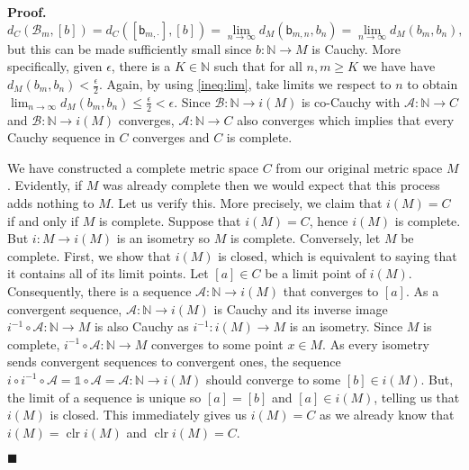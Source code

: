 \documentclass[10pt]{article}
\theoremstyle{definition}
\theoremstyle{remark}
\newenvironment{prf}{\noindent\textbf{Proof.}}{\hfill$\blacksquare$}
\DeclareMathOperator{\clr}{\text{clr}}
\begin{document}
\begin{prf}
\begin{equation}
d_C(\mathcal{B}_m,[b]) = d_C([\mathsf{b}_{m,\cdot}],[b]) = \lim_{n\to\infty}d_M(\mathsf{b}_{m,n},b_n) = \lim_{n\to\infty}d_M(b_m,b_n),
\end{equation}
but this can be made sufficiently small since $b:\mathbb{N}\to M$ is Cauchy. More specifically, given $\epsilon$, there is a $K\in\mathbb{N}$ such that for all $n,m\ge K$ we have have $d_M(b_m,b_n)<\frac{\epsilon}{2}$. Again, by using \cref{ineq:lim}, take limits we respect to $n$ to obtain $\lim_{n\to\infty}d_M(b_m,b_n)\leq\frac{\epsilon}{2}<\epsilon$. Since $\mathcal{B}:\mathbb{N}\to i(M)$ is co-Cauchy with $\mathcal{A}:\mathbb{N}\to C$ and $\mathcal{B}:\mathbb{N}\to i(M)$ converges, $\mathcal{A}:\mathbb{N}\to C$ also converges which implies that every Cauchy sequence in $C$ converges and $C$ is complete.

We have constructed a complete metric space $C$ from our original metric space $M$. Evidently, if $M$ was already complete then we would expect that this process adds nothing to $M$. Let us verify this. More precisely, we claim that $i(M)=C$ if and only if $M$ is complete. Suppose that $i(M)=C$, hence $i(M)$ is complete. But $i:M\to i(M)$ is an isometry so $M$ is complete. Conversely, let $M$ be complete. First, we show that $i(M)$ is closed, which is equivalent to saying that it contains all of its limit points. Let $[a]\in C$ be a limit point of $i(M)$. Consequently, there is a sequence $\mathcal{A}:\mathbb{N}\to i(M)$ that converges to $[a]$. As a convergent sequence, $\mathcal{A}:\mathbb{N}\to i(M)$ is Cauchy and its inverse image $i^{-1}\circ \mathcal{A}:\mathbb{N}\to M$ is also Cauchy as $i^{-1}:i(M)\to M$ is an isometry. Since $M$ is complete, $i^{-1}\circ \mathcal{A}:\mathbb{N}\to M$ converges to some point $x\in M$. As every isometry sends convergent sequences to convergent ones, the sequence $i\circ i^{-1}\circ\mathcal{A}=\mathds{1}\circ\mathcal{A}=\mathcal{A}:\mathbb{N}\to i(M)$ should converge to some $[b]\in i(M)$. But, the limit of a sequence is unique so $[a]=[b]$ and $[a]\in i(M)$, telling us that $i(M)$ is closed. This immediately gives us $i(M)=C$ as we already know that $i(M) =\clr i(M)$ and $\clr i(M) = C$.


\end{prf}
\end{document}
